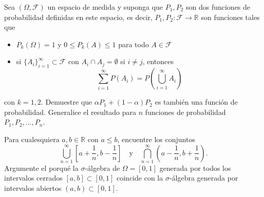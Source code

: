 \documentclass[12pt,a4paper]{article}
\begin{document}
    \begin{mdframed}[style=mdbluebox,frametitle={Ejercicio 3}]
        Sea $(\Omega,\mathcal{F})$ un espacio de medida y suponga que $P_1, P_2$ son dos funciones de probabilidad definidas en este espacio, es decir, $P_1, P_2 : \mathcal{F} \to \mathbb{R}$ son funciones tales que

        \begin{itemize}
            \item[(I)] $P_k(\Omega) = 1$ y $0 \leq P_k(A) \leq 1$ para todo $A \in \mathcal{F}$
            \item[(II)] si $\{A_i\}_{i=1}^\infty \subset \mathcal{F}$ con $A_i \cap A_j = \emptyset$ si $i \neq j$, entonces
            \[
            \sum_{i=1}^{\infty} P(A_i) = P\left(\bigcup_{i=1}^{\infty} A_i\right)
            \]
        \end{itemize}
        con $k = 1, 2$. Demuestre que $\alpha P_1 + (1 - \alpha)P_2$ es también una función de probabilidad. Generalice el resultado para $n$ funciones de probabilidad $P_1, P_2, \dots, P_n$.
    \end{mdframed}

    \begin{mdframed}[style=mdbluebox,frametitle={Ejercicio 4}]
        Para cualesquiera $a, b \in \mathbb{R}$ con $a \leq b$, encuentre los conjuntos
        \[
        \bigcup_{n=1}^{\infty} \left[a + \frac{1}{n}, b - \frac{1}{n}\right]
        \quad \text{y} \quad
        \bigcap_{n=1}^{\infty} \left(a - \frac{1}{n}, b + \frac{1}{n}\right) .
        \]
        Argumente el porqué la $\sigma$-álgebra de $\Omega = [0, 1]$ generada por todos los intervalos cerrados $[a, b] \subset [0, 1]$ coincide con la $\sigma$-álgebra generada por intervalos abiertos $(a, b) \subset [0, 1]$.
    \end{mdframed}
\end{document}
